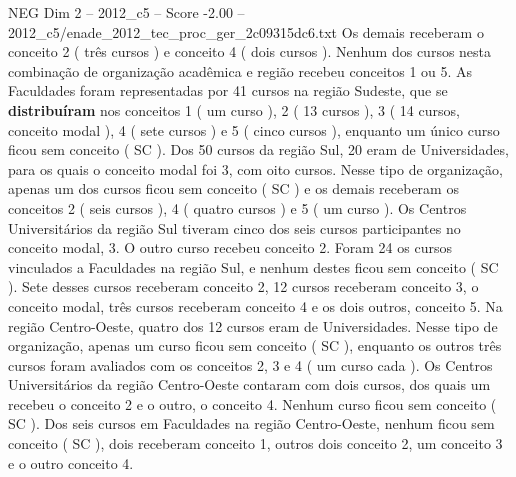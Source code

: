 \begin{textsample}{NEG Dim 2 – 2012\_c5 – Score -2.00 – 2012\_c5/enade\_2012\_tec\_proc\_ger\_2c09315dc6.txt}
Os demais receberam o conceito 2 ( três cursos ) e conceito 4 ( dois cursos ).
Nenhum dos cursos nesta combinação de organização acadêmica e região recebeu conceitos 1 ou 5.
As Faculdades foram representadas por 41 cursos na região Sudeste, que se \textbf{distribuíram} nos conceitos 1 ( um curso ), 2 ( 13 cursos ), 3 ( 14 cursos, conceito modal ), 4 ( sete cursos ) e 5 ( cinco cursos ), enquanto um único curso ficou sem conceito ( SC ).
Dos 50 cursos da região Sul, 20 eram de Universidades, para os quais o conceito modal foi 3, com oito cursos.
Nesse tipo de organização, apenas um dos cursos ficou sem conceito ( SC ) e os demais receberam os conceitos 2 ( seis cursos ), 4 ( quatro cursos ) e 5 ( um curso ).
Os Centros Universitários da região Sul tiveram cinco dos seis cursos participantes no conceito modal, 3.
O outro curso recebeu conceito 2.
Foram 24 os cursos vinculados a Faculdades na região Sul, e nenhum destes ficou sem conceito ( SC ).
Sete desses cursos receberam conceito 2, 12 cursos receberam conceito 3, o conceito modal, três cursos receberam conceito 4 e os dois outros, conceito 5.
Na região Centro-Oeste, quatro dos 12 cursos eram de Universidades.
Nesse tipo de organização, apenas um curso ficou sem conceito ( SC ), enquanto os outros três cursos foram avaliados com os conceitos 2, 3 e 4 ( um curso cada ).
Os Centros Universitários da região Centro-Oeste contaram com dois cursos, dos quais um recebeu o conceito 2 e o outro, o conceito 4.
Nenhum curso ficou sem conceito ( SC ).
Dos seis cursos em Faculdades na região Centro-Oeste, nenhum ficou sem conceito ( SC ), dois receberam conceito 1, outros dois conceito 2, um conceito 3 e o outro conceito 4.

\end{textsample}

